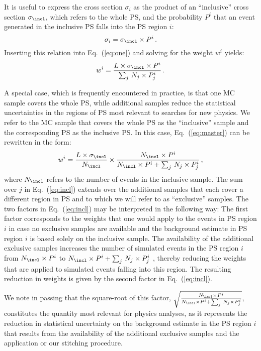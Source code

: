 It is useful to express the cross section $\sigma_{i}$ as the product of an ``inclusive'' cross section $\sigma_{\incl}$,
which refers to the whole PS, and the probability $P^{i}$ that an event generated in the inclusive PS falls into the PS region $i$:
\begin{equation*}
\sigma_{i} = \sigma_{\incl} \times P^{i} \, .
\label{eq:two}
\end{equation*}
Inserting this relation into Eq.~(\ref{eq:one}) and solving for the weight $w^{i}$ yields:
\begin{equation}
w^{i} = \frac{L \times \sigma_{\incl} \times P^{i}}{\sum_{j} \, N_{j} \times P_{j}^{i}} \, .
\label{eq:master}
\end{equation}

A special case, which is frequently encountered in practice,
is that one MC sample covers the whole PS,
while additional samples reduce the statistical uncertainties in the regions of PS most relevant to searches for new physics.
We refer to the MC sample that covers the whole PS as the ``inclusive'' sample and the corresponding PS as the inclusive PS.
In this case, Eq.~(\ref{eq:master}) can be rewritten in the form:
\begin{equation}
w^{i} = \frac{L \times \sigma_{\incl}}{N_{\incl}} \times \frac{N_{\incl} \times P^{i}}{N_{\incl} \times P^{i} + \sum_{j} \, N_{j} \times P_{j}^{i}} \, ,
\label{eq:incl}
\end{equation}
where $N_{\incl}$ refers to the number of events in the inclusive sample.
The sum over $j$ in Eq.~(\ref{eq:incl}) extends over the additional samples that each cover a different region in PS
and to which we will refer to as ``exclusive'' samples.
The two factors in Eq.~(\ref{eq:incl}) may be interpreted in the following way:
The first factor corresponds to the weights that one would apply to the events in PS region $i$ 
in case no exclusive samples are available and the background estimate in PS region $i$ is based solely on the inclusive sample.
The availability of the additional exclusive samples increases the number of simulated events in the PS region $i$ 
from $N_{\incl} \times P^{i}$ to $N_{\incl} \times P^{i} + \sum_{j} \, N_{j} \times P_{j}^{i}$ ,
thereby reducing the weights that are applied to simulated events falling into this region.
The resulting reduction in weights is given by the second factor in Eq.~(\ref{eq:incl}).

We note in passing that the square-root of this factor,
$\sqrt{\frac{N_{\incl} \times P^{i}}{N_{\incl} \times P^{i} + \sum_{j} \, N_{j} \times P_{j}^{i}}}$,
constitutes the quantity most relevant for physics analyses,
as it represents the reduction in statistical uncertainty on the background estimate in the PS region $i$
that results from the availability of the additional exclusive samples and the application or our stitching procedure.

